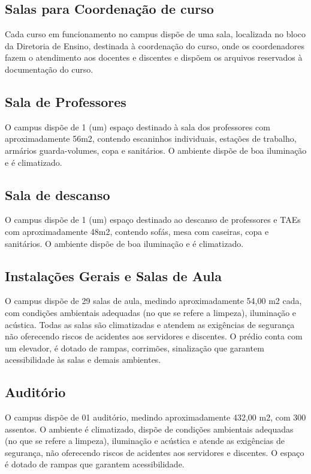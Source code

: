 \subsection{Salas para Coordenação de curso}
Cada curso em funcionamento no campus dispõe de uma sala, localizada no bloco da Diretoria de Ensino, destinada à coordenação do curso, onde os coordenadores fazem o atendimento aos docentes e discentes e dispõem os arquivos reservados à documentação do curso.\\

\subsection{Sala de Professores}
O campus dispõe de 1 (um) espaço destinado à sala dos professores com aproximadamente 56m2, contendo escaninhos individuais, estações de trabalho, armários guarda-volumes, copa e sanitários. O ambiente dispõe de boa iluminação e é climatizado.

\subsection{Sala de descanso}
O campus dispõe de 1 (um) espaço destinado ao descanso de professores e TAEs com aproximadamente 48m2, contendo sofás, mesa com caseiras, copa e sanitários. O ambiente dispõe de boa iluminação e é climatizado.\\

\subsection{Instalações Gerais e Salas de Aula}
O campus dispõe de 29 salas de aula, medindo aproximadamente 54,00 m2 cada, com condições ambientais adequadas (no que se refere a limpeza), iluminação e acústica. Todas as salas são climatizadas e atendem as exigências de segurança não oferecendo riscos de acidentes aos servidores e discentes. O prédio conta com um elevador, é dotado de rampas, corrimões, sinalização que garantem acessibilidade às salas e demais ambientes.\\

\subsection{Auditório}
O campus dispõe de 01 auditório, medindo aproximadamente 432,00 m2, com 300 assentos. O ambiente é climatizado, dispõe de condições ambientais adequadas (no que se refere a limpeza), iluminação e acústica e atende as exigências de segurança, não oferecendo riscos de acidentes aos servidores e discentes. O espaço é dotado de rampas que garantem acessibilidade.\\

